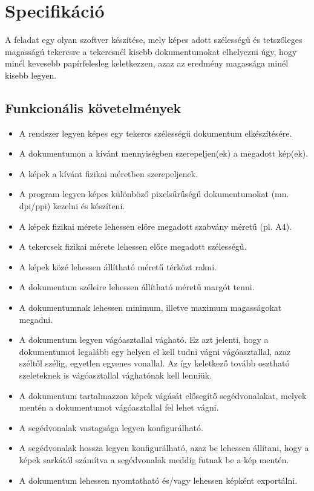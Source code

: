 \chapter{Specifikáció}

A feladat egy olyan szoftver készítése, mely képes adott szélességű és tetszőleges magasságú tekercsre a tekercsnél kisebb dokumentumokat elhelyezni úgy, hogy minél kevesebb papírfelesleg keletkezzen, azaz az eredmény magassága minél kisebb legyen. 

\section{Funkcionális követelmények}
\begin{itemize}
    \item A rendszer legyen képes egy tekercs szélességű dokumentum elkészítésére.
    \item A dokumentumon a kívánt mennyiségben szerepeljen(ek) a megadott kép(ek).
    \item A képek a kívánt fizikai méretben szerepeljenek.
    \item A program legyen képes különböző pixelsűrűségű dokumentumokat (mn. dpi/ppi) kezelni és készíteni.
    \item A képek fizikai mérete lehessen előre megadott szabvány méretű (pl. A4).
    \item A tekercsek fizikai mérete lehessen előre megadott szélességű.
    \item A képek közé lehessen állítható méretű térközt rakni.
    \item A dokumentum széleire lehessen állítható méretű margót tenni.
    \item A dokumentumnak lehessen minimum, illetve maximum magasságokat megadni. 
    \item A dokumentum legyen vágóasztallal vágható. Ez azt jelenti, hogy a dokumentumot legalább egy helyen el kell tudni vágni vágóasztallal, azaz széltől szélig, egyetlen egyenes vonallal. Az így keletkező tovább osztható szeleteknek is vágóasztallal vághatónak kell lenniük.
    \item A dokumentum tartalmazzon képek vágását elősegítő segédvonalakat, melyek mentén a dokumentumot vágóasztallal fel lehet vágni.
    \item A segédvonalak vastagsága legyen konfigurálható.
    \item A segédvonalak hossza legyen konfigurálható, azaz be lehessen állítani, hogy a képek sarkától számítva a segédvonalak meddig futnak be a kép mentén.
    \item A dokumentum lehessen nyomtatható és/vagy lehessen képként exportálni.
\end{itemize}

